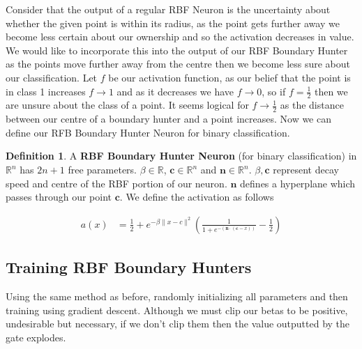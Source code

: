 \documentclass[notitlepage]{report}
\theoremstyle{definition}
\newtheorem{definition}{Definition}[section]
\begin{document}
Consider that the output of a regular RBF Neuron is the uncertainty about whether the given point is within its radius, as the point gets further away we become less certain about our ownership and so the activation decreases in value. We would like to incorporate this into the output of our RBF Boundary Hunter as the points move further away from the centre then we become less sure about our classification. Let $f$ be our activation function, as our belief that the point is in class 1 increases $f \rightarrow 1$ and as it decreases we have $f \rightarrow 0$, so if $f = \frac{1}{2}$ then we are unsure about the class of a point. It seems logical for $f \rightarrow \frac{1}{2}$ as the distance between our centre of a boundary hunter and a point increases. Now we can define our RFB Boundary Hunter Neuron for binary classification.\\

\theoremstyle{definition}
\begin{definition}
A \textbf{RBF Boundary Hunter Neuron} (for binary classification) in $\mathbb{R}^n$ has $2n + 1$ free parameters. $\beta \in \mathbb{R}$, $\mathbf{c} \in \mathbb{R}^n$ and $\mathbf{n} \in \mathbb{R}^n$. $\beta, \mathbf{c}$ represent decay speed and centre of the RBF portion of our neuron. $\mathbf{n}$ defines a hyperplane which passes through our point $\mathbf{c}$. We define the activation as follows

\begin{align}
a(x) &= \frac{1}{2} + e^{-\beta \lVert x - c \lVert^2}(\frac{1}{1 + e^{-(\mathbf{n} \cdot (\mathbf{c} - x))}} - \frac{1}{2})
\end{align}

\end{definition}

\subsection{Training RBF Boundary Hunters}
Using the same method as before, randomly initializing all parameters and then training using gradient descent. Although we must clip our betas to be positive, undesirable but necessary, if we don't clip them then the value outputted by the gate explodes.
\end{document}
